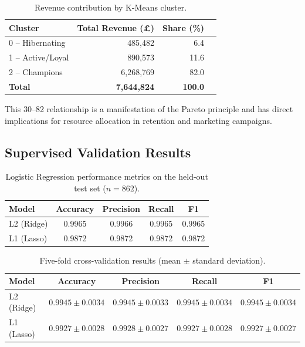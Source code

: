 \documentclass[12pt,a4paper]{article}
\begin{document}
\begin{table}[H]
  \centering
  \caption{Revenue contribution by K-Means cluster.}
  \label{tab:revenue}
  \begin{tabular}{lrrr}
    \toprule
    \textbf{Cluster} & \textbf{Total Revenue (\pounds)} & \textbf{Share (\%)} \\
    \midrule
    0 -- Hibernating  & 485,482   &  6.4 \\
    1 -- Active/Loyal & 890,573   & 11.6 \\
    2 -- Champions    & 6,268,769 & 82.0 \\
    \midrule
    \textbf{Total}    & \textbf{7,644,824} & \textbf{100.0} \\
    \bottomrule
  \end{tabular}
\end{table}

This 30--82 relationship is a manifestation of the Pareto principle and has direct
implications for resource allocation in retention and marketing campaigns.

\subsection{Supervised Validation Results}

\begin{table}[H]
  \centering
  \caption{Logistic Regression performance metrics on the held-out test set ($n=862$).}
  \label{tab:lr_results}
  \begin{tabular}{lcccc}
    \toprule
    \textbf{Model} & \textbf{Accuracy} & \textbf{Precision} & \textbf{Recall} & \textbf{F1} \\
    \midrule
    L2 (Ridge) & 0.9965 & 0.9966 & 0.9965 & 0.9965 \\
    L1 (Lasso) & 0.9872 & 0.9872 & 0.9872 & 0.9872 \\
    \bottomrule
  \end{tabular}
\end{table}

\begin{table}[H]
  \centering
  \caption{Five-fold cross-validation results (mean $\pm$ standard deviation).}
  \label{tab:cv_results}
  \begin{tabular}{lcccc}
    \toprule
    \textbf{Model} & \textbf{Accuracy} & \textbf{Precision} & \textbf{Recall} & \textbf{F1} \\
    \midrule
    L2 (Ridge) & $0.9945 \pm 0.0034$ & $0.9945 \pm 0.0033$ & $0.9945 \pm 0.0034$ & $0.9945 \pm 0.0034$ \\
    L1 (Lasso) & $0.9927 \pm 0.0028$ & $0.9928 \pm 0.0027$ & $0.9927 \pm 0.0028$ & $0.9927 \pm 0.0027$ \\
    \bottomrule
  \end{tabular}
\end{table}
\end{document}
